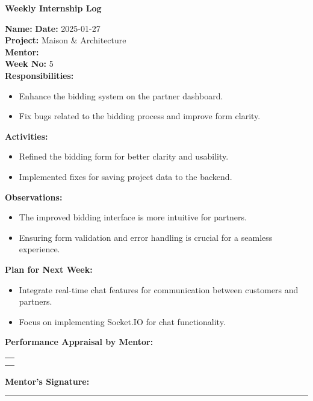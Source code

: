 \begin{center}
    \bfseries Weekly Internship Log
\end{center}

\noindent
\textbf{Name:}  \hfill \textbf{Date:} 2025-01-27 \\
\textbf{Project:} Maison \& Architecture \hfill \\
\textbf{Mentor:}  \\
\textbf{Week No:} 5 \\

\noindent
\textbf{Responsibilities:}
\begin{itemize}
    \item Enhance the bidding system on the partner dashboard.
    \item Fix bugs related to the bidding process and improve form clarity.
\end{itemize}

\noindent
\textbf{Activities:}
\begin{itemize}
    \item Refined the bidding form for better clarity and usability.
    \item Implemented fixes for saving project data to the backend.
\end{itemize}

\noindent
\textbf{Observations:}
\begin{itemize}
    \item The improved bidding interface is more intuitive for partners.
    \item Ensuring form validation and error handling is crucial for a seamless experience.
\end{itemize}

\noindent
\textbf{Plan for Next Week:}
\begin{itemize}
    \item Integrate real-time chat features for communication between customers and partners.
    \item Focus on implementing Socket.IO for chat functionality.
\end{itemize}

\noindent
\textbf{Performance Appraisal by Mentor:} \\
\begin{table}[h]
    \centering
    \noindent
    \begin{tabularx}{\textwidth} { 
        | >{\centering\arraybackslash}X| }

        \hline
        \\ \\
        \hline
    \end{tabularx}
\end{table}

\vspace{2em}
\noindent
\textbf{Mentor’s Signature:} \\
\rule{0.4\textwidth}{0.5pt}
